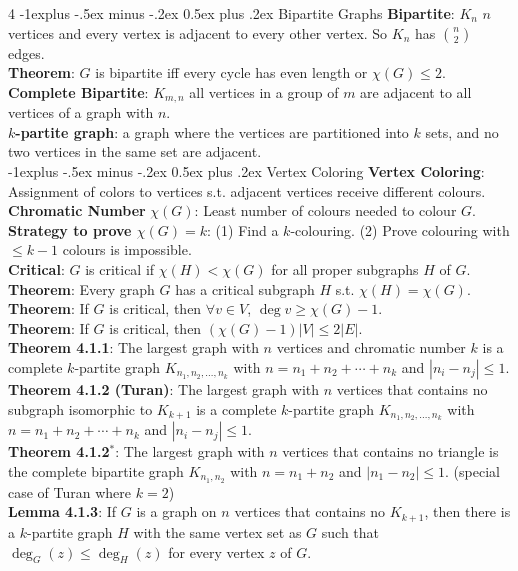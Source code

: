 \documentclass[letterpaper, 8pt]{extarticle}
\makeatletter
\renewcommand{\section}{\@startsection{section}{1}{0mm}%
	{-1explus -.5ex minus -.2ex}%
	{0.5ex plus .2ex}%
	{\normalfont\normalsize\bfseries}}
\makeatother
\begin{document}
\begin{multicols*}{4}
	\section{Bipartite Graphs}
	\textbf{Bipartite}: $K_n$ $n$ vertices and every vertex is adjacent to every other vertex. So $K_n$ has $n \choose 2$ edges. \\
	\textbf{Theorem}: $G$ is bipartite iff every cycle has even length or $\chi(G) \le 2$. \\
	\textbf{Complete Bipartite}: $K_{m,n}$ all vertices in a group of $m$ are adjacent to all vertices of a graph with $n$. \\
	\textbf{$k$-partite graph}: a graph where the vertices are partitioned into $k$ sets, and no two vertices in the same set are adjacent. \\

	\section{Vertex Coloring}
	\textbf{Vertex Coloring}: Assignment of colors to vertices s.t. adjacent vertices receive different colours. \\
	\textbf{Chromatic Number} $\chi(G)$: Least number of colours needed to colour $G$. \\
	\textbf{Strategy to prove $\chi(G) = k$}: (1) Find a $k$-colouring. (2) Prove colouring with $\le k-1$ colours is impossible. \\
	\textbf{Critical}: $G$ is critical if $\chi(H) < \chi(G)$ for all proper subgraphs $H$ of $G$. \\
	\textbf{Theorem}: Every graph $G$ has a critical subgraph $H$ s.t. $\chi(H) = \chi(G)$. \\
	\textbf{Theorem}: If $G$ is critical, then $\forall v \in V$, $\deg v \ge \chi(G) - 1$. \\
	\textbf{Theorem}: If $G$ is critical, then $(\chi(G) - 1)|V| \le 2|E|$. \\
	\textbf{Theorem 4.1.1}: The largest graph with $n$ vertices and chromatic number $k$ is a complete $k$-partite graph $K_{n_1, n_2, \ldots, n_k}$ with $n = n_1 + n_2 + \cdots + n_k$ and $|n_i - n_j| \le 1$. \\
	\textbf{Theorem 4.1.2 (Turan)}: The largest graph with $n$ vertices that contains no subgraph isomorphic to $K_{k+1}$ is a complete $k$-partite graph $K_{n_1, n_2, \ldots, n_k}$ with $n = n_1 + n_2 + \cdots + n_k$ and $|n_i - n_j| \le 1$. \\
	\textbf{Theorem 4.1.2$^*$}: The largest graph with $n$ vertices that contains no triangle is the complete bipartite graph $K_{n_1, n_2}$ with $n = n_1 + n_2$ and $|n_1 - n_2| \le 1$. (special case of Turan where $k = 2$) \\
	\textbf{Lemma 4.1.3}: If $G$ is a graph on $n$ vertices that contains no $K_{k+1}$, then there is a $k$-partite graph $H$ with the same vertex set as $G$ such that $\deg_G(z) \le \deg_H(z)$ for every vertex $z$ of $G$.


\end{multicols*}
\end{document}
